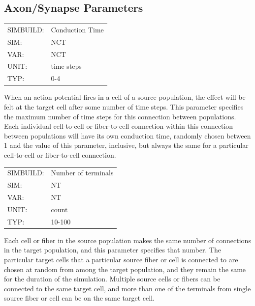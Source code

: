 \documentclass[12pt,openany,oneside]{book}
\begin{document}
\subsection{Axon/Synapse Parameters}
\label{Axon Parameters}

\begin{flushleft}
\begin{tabular}{@{}ll@{}}
SIMBUILD: & Conduction Time\\
SIM: & NCT\\
VAR: & NCT\\
UNIT: & time steps\\
TYP: & 0-4\\
\end{tabular}
\end{flushleft}
\noindent
When an action potential fires in a cell of a source population, the
effect will be felt at the target cell after some number of time
steps. This parameter specifies the maximum number of time steps for
this connection between populations. Each individual cell-to-cell or
fiber-to-cell connection within this connection between populations
will have its own conduction time, randomly chosen between 1 and the
value of this parameter, inclusive, but always the same for a
particular cell-to-cell or fiber-to-cell connection.
\filbreak
\vspace{\baselineskip}

\begin{flushleft}
\begin{tabular}{@{}ll@{}}
SIMBUILD: & Number of terminals\\
SIM: & NT\\
VAR: & NT\\
UNIT: & count\\
TYP: & 10-100\\
\end{tabular}
\end{flushleft}
\noindent
Each cell or fiber in the source population makes the same number of
connections in the target population, and this parameter specifies
that number. The particular target cells that a particular source
fiber or cell is connected to are chosen at random from among the
target population, and they remain the same for the duration of the
simulation. Multiple source cells or fibers can be connected to the
same target cell, and more than one of the terminals from single
source fiber or cell can be on the same target cell.
\filbreak
\vspace{\baselineskip}
\end{document}
